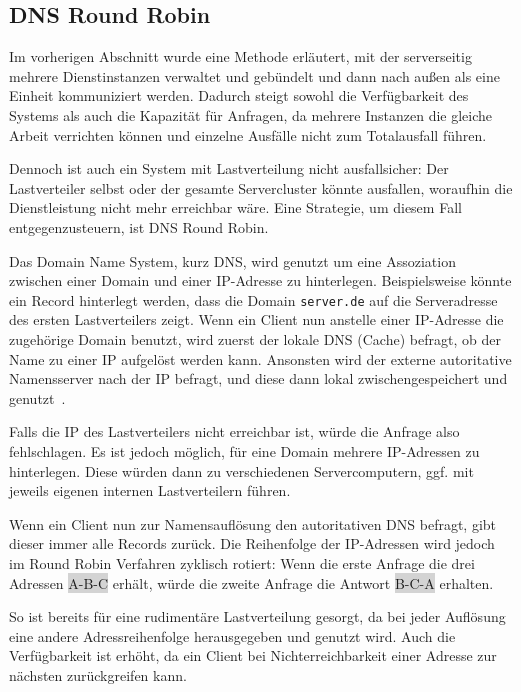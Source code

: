 \subsection{DNS Round Robin}
Im vorherigen Abschnitt wurde eine Methode erläutert, mit der serverseitig mehrere Dienstinstanzen verwaltet und gebündelt und dann nach außen als eine Einheit kommuniziert werden.
Dadurch steigt sowohl die Verfügbarkeit des Systems als auch die Kapazität für Anfragen, da mehrere Instanzen die gleiche Arbeit verrichten können und einzelne Ausfälle nicht zum Totalausfall führen.

Dennoch ist auch ein System mit Lastverteilung nicht ausfallsicher:
Der Lastverteiler selbst oder der gesamte Servercluster könnte ausfallen, woraufhin die Dienstleistung nicht mehr erreichbar wäre.
Eine Strategie, um diesem Fall entgegenzusteuern, ist DNS Round Robin.

Das Domain Name System, kurz DNS, wird genutzt um eine Assoziation zwischen einer Domain und einer IP-Adresse zu hinterlegen.
Beispielsweise könnte ein Record hinterlegt werden, dass die Domain \verb|server.de| auf die Serveradresse des ersten Lastverteilers zeigt.
Wenn ein Client nun anstelle einer IP-Adresse die zugehörige Domain benutzt, wird zuerst der lokale DNS (Cache) befragt, ob der Name zu einer IP aufgelöst werden kann.
Ansonsten wird der externe autoritative Namensserver nach der IP befragt, und diese dann lokal zwischengespeichert und genutzt~\cite{Kopparapu.2002}.

Falls die IP des Lastverteilers nicht erreichbar ist, würde die Anfrage also fehlschlagen.
Es ist jedoch möglich, für eine Domain mehrere IP-Adressen zu hinterlegen.
Diese würden dann zu verschiedenen Servercomputern, ggf. mit jeweils eigenen internen Lastverteilern führen.

Wenn ein Client nun zur Namensauflösung den autoritativen DNS befragt, gibt dieser immer alle Records zurück.
Die Reihenfolge der IP-Adressen wird jedoch im Round Robin Verfahren zyklisch rotiert:
Wenn die erste Anfrage die drei Adressen \colorbox{lightgray}{A-B-C} erhält, würde die zweite Anfrage die Antwort \colorbox{lightgray}{B-C-A} erhalten.

So ist bereits für eine rudimentäre Lastverteilung gesorgt, da bei jeder Auflösung eine andere Adressreihenfolge herausgegeben und genutzt wird.
Auch die Verfügbarkeit ist erhöht, da ein Client bei Nichterreichbarkeit einer Adresse zur nächsten zurückgreifen kann.

